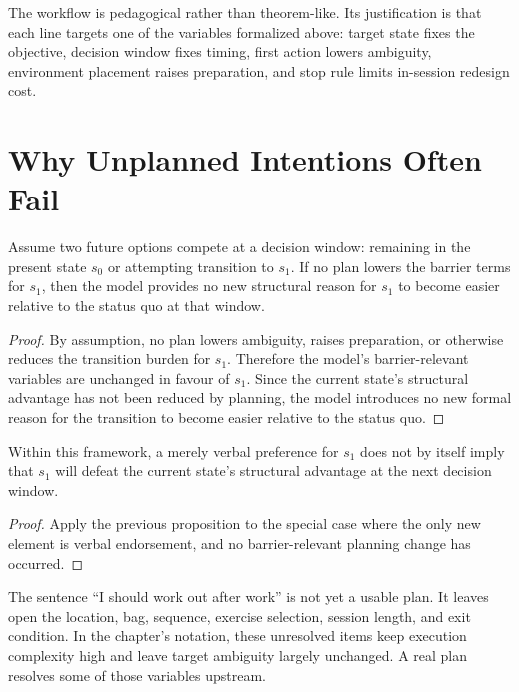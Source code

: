 \begin{remark}
The workflow is pedagogical rather than theorem-like. Its justification is that
each line targets one of the variables formalized above: target state fixes the
objective, decision window fixes timing, first action lowers ambiguity,
environment placement raises preparation, and stop rule limits in-session
redesign cost.
\end{remark}

\section{Why Unplanned Intentions Often Fail}

\begin{proposition}
Assume two future options compete at a decision window: remaining in the
present state $s_0$ or attempting transition to $s_1$. If no plan lowers the
barrier terms for $s_1$, then the model provides no new structural reason for
$s_1$ to become easier relative to the status quo at that window.
\end{proposition}

\begin{proof}
By assumption, no plan lowers ambiguity, raises preparation, or otherwise
reduces the transition burden for $s_1$. Therefore the model's barrier-relevant
variables are unchanged in favour of $s_1$. Since the current state's
structural advantage has not been reduced by planning, the model introduces no
new formal reason for the transition to become easier relative to the status
quo.
\end{proof}

\begin{corollary}
Within this framework, a merely verbal preference for $s_1$ does not by itself
imply that $s_1$ will defeat the current state's structural advantage at the
next decision window.
\end{corollary}

\begin{proof}
Apply the previous proposition to the special case where the only new element
is verbal endorsement, and no barrier-relevant planning change has occurred.
\end{proof}

\begin{example}
The sentence ``I should work out after work'' is not yet a usable plan. It
leaves open the location, bag, sequence, exercise selection, session length,
and exit condition. In the chapter's notation, these unresolved items keep
execution complexity high and leave target ambiguity largely unchanged. A real
plan resolves some of those variables upstream.
\end{example}

